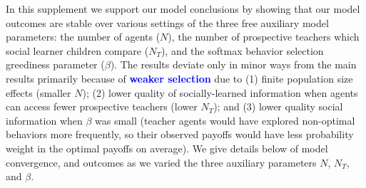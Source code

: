 \documentclass[letterpaper,11.5pt]{scrartcl}
\newcommand{\ps}[1]{{\textcolor{mygreen} {({\tiny PS:} #1)}}}
\newcommand{\edit}[1]{{\bfseries \textcolor{blue} {#1}}}
\begin{document}





In this supplement we support our model conclusions by showing that our model
outcomes are stable over various settings of the three free auxiliary model
parameters: the number of agents ($N$), the number of
prospective teachers which social learner children compare
($N_T$), and the softmax behavior selection greediness parameter ($\beta$).
The results deviate only in minor ways from the main results primarily because of
\edit{weaker selection}
due to (1) finite population size effects (smaller $N$);
(2) lower quality of socially-learned information when agents can access fewer
prospective teachers (lower $N_T$); and (3) lower quality social information when $\beta$
was small (teacher agents would have explored non-optimal behaviors more
frequently, so their observed payoffs would have less probability weight in
the optimal payoffs on average). We give details below of model convergence, and
outcomes as we varied the three auxiliary parameters $N$, $N_T$, and $\beta$.


\clearpage
\end{document}
